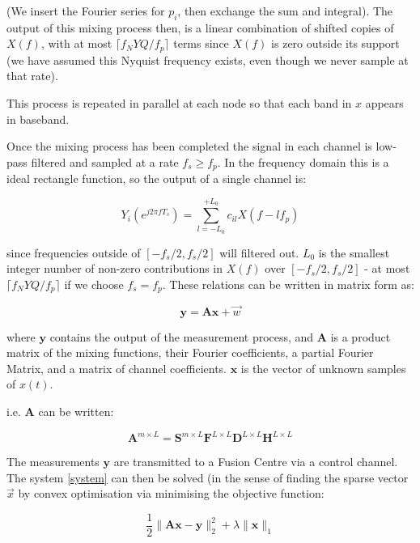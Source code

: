\documentclass{article}
\begin{document}
(We insert the Fourier series for \(p_i\), then exchange the sum and integral). The output of this mixing process then, is a linear combination of shifted copies of \(X\left(f\right)\), with at most \(\lceil f_NYQ/f_p\rceil\) terms since \(X\left(f\right)\) is zero outside its support (we have assumed this Nyquist frequency exists, even though we never sample at that rate).

This process is repeated in parallel at each node so that each band in \(x\) appears in baseband.

Once the mixing process has been completed the signal in each channel is low-pass filtered and sampled at a rate \(f_s \geq f_p\). In the frequency domain this is a ideal rectangle function, so the output of a single channel is:

\begin{equation}
Y_i\left(e^{j 2 \pi f T_s }\right) = \sum_{l = -L_0}^{+L_0} c_{il} X\left(f-lf_p\right)
\end{equation}

since frequencies outside of \([-f_s/2, f_s/2]\) will filtered out. \(L_0\) is the smallest integer number of non-zero contributions in \(X\left(f\right)\) over \([-f_s/2, f_s/2]\) - at most \(\lceil f_NYQ/f_p\rceil\) if we choose \(f_s = f_p\). These relations can be written in matrix form as:

\begin{equation}
\textbf{y} = \textbf{A}\textbf{x} + \vec{w}
\label{system}
\end{equation}

where \(\textbf{y}\) contains the output of the measurement process, and \(\textbf{A}\) is a product matrix of the mixing functions, their Fourier coefficients, a partial Fourier Matrix, and a matrix of channel coefficients. \(\textbf{x}\) is the vector of unknown samples of \(x\left(t\right)\). 

i.e. \(\textbf{A}\) can be written: 

\begin{equation}
\textbf{A}^{m\times L} = \textbf{S}^{m\times L} \textbf{F}^{L\times L} \textbf{D}^{L \times L} \textbf{H}^{L \times L}
\end{equation}

The measurements \(\textbf{y}\) are transmitted to a Fusion Centre via a control channel. The system  \ref{system} can then be solved (in the sense of finding the sparse vector \(\vec{x}\) by convex optimisation via minimising the objective function:

\begin{equation}
\frac{1}{2}\|\textbf{Ax}-\textbf{y}\|_2^2 + \lambda \|\textbf{x}\|_1
\end{equation}
\end{document}
